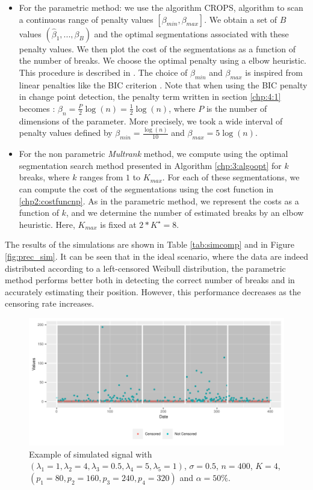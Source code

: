     \begin{itemize}
        \item For the parametric method: we use the algorithm CROPS, algorithm to scan a continuous range of penalty values $[\beta_{min},\beta_{max}]$. We obtain a set of $B$ values $(\hat \beta_1,...,\beta_B)$ and the optimal segmentations associated with these penalty values. We then plot the cost of the segmentations as a function of the number of breaks. We choose the optimal penalty using a elbow heuristic. This procedure is described in \cite{haynes2014}. The choice of $\beta_{min}$ and $\beta_{max}$ is inspired from linear penalties like the BIC criterion \cite{YAO1988181}. Note that when using the BIC penalty in change point detection, the penalty term written in section \ref{chp:4:1} becomes : $\beta_n = \frac{P}{2}\log(n) = \frac{1}{2}\log(n)$, where $P$ is the number of dimensions of the parameter. More precisely, we took a wide interval of penalty values defined by $\beta_{min} = \frac{\log(n)}{10}$ and $\beta_{max} = 5\log(n)$.
        \item For the non parametric \textit{Multrank} method, we compute using the optimal segmentation search method presented in Algorithm \ref{chp:3:algoopt} for $k$ breaks, where $k$ ranges from $1$ to $K_{max}$. For each of these segmentations, we can compute the cost of the segmentations using the cost function in \ref{chp2:costfuncnp}. As in the parametric method, we represent the costs as a function of $k$, and we determine the number of estimated breaks by an elbow heuristic. Here, $K_{max}$ is fixed at $2*K^\star = 8$.
    \end{itemize}
The results of the simulations are shown in Table \ref{tab:simcomp} and in Figure \ref{fig:prec_sim}. It can be seen that in the ideal scenario, where the data are indeed distributed according to a left-censored Weibull distribution, the parametric method performs better both in detecting the correct number of breaks and in accurately estimating their position. However, this performance decreases as the censoring rate increases.

\begin{figure}[ht]
    \centering
    \includegraphics{figs/Chap4/Ex_sim.pdf}
    \caption{Example of simulated signal with $(\lambda_1 = 1, \lambda_2 = 4, \lambda_3 = 0.5, \lambda_4 = 5, \lambda_5 = 1)$, $\sigma = 0.5 $, $n = 400$, $K = 4$, $(p_1 = 80,p_2 = 160,p_3 = 240,p_4 = 320)$ and $\alpha = 50\%$.}
    \label{fig:ex_sim}
\end{figure}

